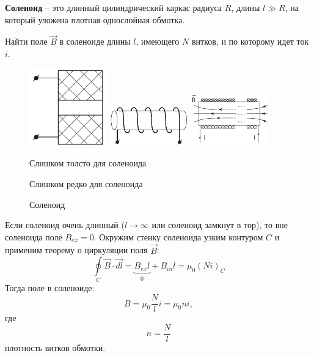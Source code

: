     \begin{definition}
        \textbf{Соленоид} -- это длинный цилиндрический каркас радиуса \( R \),
        длины \( l \gg R \), на который уложена плотная однослойная обмотка.
    \end{definition}

    \begin{example}
        Найти поле \( \vec{B} \) в соленоиде длины \( l \), имеющего \( N \)
        витков, и по которому идет ток \( i \).
    \end{example}
    
    
    \begin{figure}[b!]
        \center
        \includegraphics[width=0.3\textwidth]{lec08/fat_solenoid.pdf}
        \hfill
        \includegraphics[width=0.3\textwidth]{lec08/loose_solenoid.pdf}
        \hfill
        \includegraphics[width=0.3\textwidth]{lec08/solenoid.pdf}
        \parbox[t]{.3\textwidth}{\caption{Слишком толсто для соленоида}}
        \hfill
        \parbox[t]{.3\textwidth}{\caption{Слишком редко для соленоида}}
        \hfill
        \parbox[t]{.3\textwidth}{\caption{Соленоид}}
    \end{figure}
    
    \begin{solution}
        Если соленоид очень длинный (\( l \rightarrow \infty \) или соленоид
        замкнут в тор), то вне соленоида поле \( B_{ex} = 0 \). Окружим стенку
        соленоида узким контуром \( C \) и применим теорему о циркуляции поля
        \( \vec{B} \):
        \[
            \oint\limits_C \vec{B}\cdot\vec{dl} =
            \underbrace{B_{ex}l}_{0} + B_{in}l = \mu_0 (Ni)_C
        \]
        Тогда поле в соленоиде:
        \begin{equation}
            B = \mu_0 \frac{N}{l}i = \mu_0 ni,
            \label{eq8:n3}
        \end{equation}
        где
        \[
            n = \frac{N}{l}
        \]
        плотность витков обмотки.
    \end{solution}
    
